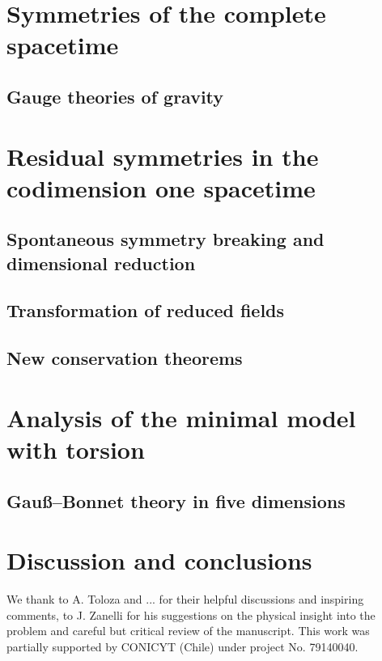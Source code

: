 \documentclass[aps,prd,12pt,superscriptaddress,showpacs,showkeys,reprint]{revtex4-1}
\begin{document}
\section{Symmetries of the complete spacetime}

\subsection*{Gauge theories of gravity}

\section{Residual symmetries in the codimension one spacetime}

\subsection*{Spontaneous symmetry breaking and dimensional reduction}

\subsection*{Transformation of reduced fields}

\subsection*{New conservation theorems}

\section{Analysis of the minimal model with torsion}

\subsection*{Gau\ss--Bonnet theory in five dimensions}

\section{Discussion and conclusions}

\begin{acknowledgments}
  We thank to A. Toloza and ...  for their helpful discussions and inspiring comments, to J. Zanelli for his suggestions on the physical insight into the problem and careful but critical review of the manuscript.
  This work was partially supported by CONICYT (Chile) under project No. 79140040.
\end{acknowledgments}
\end{document}
